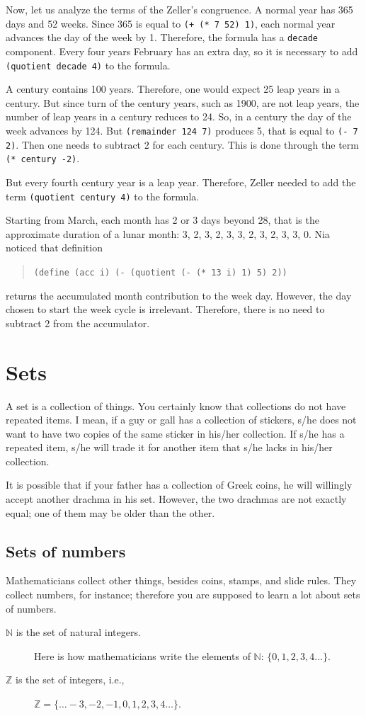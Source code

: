 \documentclass[a4paper,12pt]{book}
\begin{document}
Now, let us analyze the terms of the Zeller's
congruence. A
normal year has 365 days and 52 weeks.
Since 365 is equal to \verb|(+ (* 7 52) 1)|,
each normal year advances the day of the
week by 1. Therefore, the formula has a
\verb|decade| component.
Every four years
February has an extra day,
so it is necessary to add
\verb|(quotient decade 4)|
to the formula.

A century contains 100 years.
Therefore, one would expect  25
leap years in a century. But since
 turn of the century years, such as 1900, are
 not leap years, the number of leap
 years in a century reduces to 24.
 So, in a century the day of the
 week advances by 124. But
 \verb|(remainder 124 7)| produces
 5, that is equal to \verb|(- 7 2)|.
 Then one needs to subtract 2 for
 each century. This is done through
 the term \verb|(* century -2)|.
 
But every fourth century year is
a leap year. Therefore, Zeller needed to 
add the term \verb|(quotient century 4)|
to the formula.

Starting from March, each month
has 2 or 3 days beyond 28, that is
the approximate duration of a lunar
month: 3, 2,
3, 2, 3, 3, 2, 3, 2, 3, 3, 0.
Nia noticed that definition
\begin{quote}
\verb|(define (acc i) (- (quotient (- (* 13 i) 1) 5) 2))|
\end{quote}
returns the accumulated month contribution
to the week day.
However, the day chosen to start
the week cycle is irrelevant. Therefore,
there is no need to subtract 2 from the
accumulator.

\chapter{Sets}
 A set is a collection of things. You certainly know that
collections do not have repeated items. I mean, if a guy or gall has
a collection of stickers, s/he does not want to have two
copies of the same sticker in his/her collection. If s/he has a
repeated item, s/he will trade it for another item that s/he lacks
in his/her collection.


It is possible that if your father has a collection of Greek
coins, he will willingly accept another drachma in his set.
However, the two drachmas are not exactly equal; one of them may be older
than the other.

\section{Sets of numbers}
Mathematicians collect other things, besides
coins, stamps, and slide rules. They collect numbers, for instance;
therefore you are supposed to learn a lot about sets of numbers.
\begin{description}
\item[$\mathbb{N}$ is the set of natural integers.] Here is how mathematicians  write the
elements of $\mathbb{N}$: $\{0,1,2,3,4\ldots\}$.
\item[$\mathbb{Z}$ is the set of integers, i.e.,] $\mathbb{Z}=\{\ldots-3, -2, -1, 0, 1, 2, 3, 4\ldots\}$.
\end{description}
\end{document}
